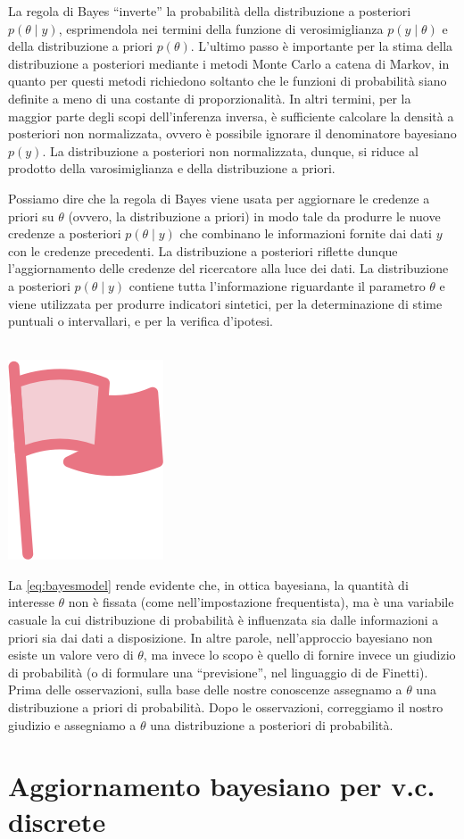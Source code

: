 \documentclass[
  10pt,
  italian,
  a4paper,
  extrafontsizes,onecolumn,openright
  ]{memoir}
\newenvironment{mdframedwithfootImportant}
{   
    \savenotes
    \begin{mdframed}[%
    topline=true, bottomline=true, linecolor=oiR, linewidth=0.5pt,
    rightline=false, leftline=false,
    backgroundcolor=oiLGray]
    \renewcommand{\thempfootnote}{\arabic{footnote}}
    }
{
    \end{mdframed}
    \spewnotes
}
\newenvironment{important}{
    \let\oldtextbf\textbf
    \renewcommand{\textbf}[1]{{\textcolor{oiR}{\oldtextbf{##1}}}}
\vspace{4mm}
\begin{mdframedwithfootImportant}
\begin{minipage}[t]{0.10\textwidth}
{$\:$ \\ \setkeys{Gin}{width=2.5em,keepaspectratio}\includegraphics{images/_icons/important.png}}
\end{minipage}
\hfill
\begin{minipage}[t]{0.90\textwidth}
\vspace{-2mm}
\setlength{\parskip}{1em}
}{\end{minipage}
\end{mdframedwithfootImportant}
\vspace{4mm}
}
\begin{document}
La regola di Bayes ``inverte'' la probabilità della distribuzione a posteriori \(p(\theta \mid y)\), esprimendola nei termini della funzione di verosimiglianza \(p(y \mid \theta)\) e della distribuzione a priori \(p(\theta)\). L'ultimo passo è importante per la stima della distribuzione a posteriori mediante i metodi Monte Carlo a catena di Markov, in quanto per questi metodi richiedono soltanto che le funzioni di probabilità siano definite a meno di una costante di proporzionalità. In altri termini, per la maggior parte degli scopi dell'inferenza inversa, è sufficiente calcolare la densità a posteriori non normalizzata, ovvero è possibile ignorare il denominatore bayesiano \(p(y)\). La distribuzione a posteriori non normalizzata, dunque, si riduce al prodotto della varosimiglianza e della distribuzione a priori.

Possiamo dire che la regola di Bayes viene usata per aggiornare le credenze a priori su \(\theta\) (ovvero, la distribuzione a priori) in modo tale da produrre le nuove credenze a posteriori \(p(\theta \mid y)\) che combinano le informazioni fornite dai dati \(y\) con le credenze precedenti. La distribuzione a posteriori riflette dunque l'aggiornamento delle credenze del ricercatore alla luce dei dati. La distribuzione a posteriori \(p(\theta \mid y)\) contiene tutta l'informazione riguardante il parametro \(\theta\) e viene utilizzata per produrre indicatori sintetici, per la determinazione di stime puntuali o intervallari, e per la verifica d'ipotesi.

\begin{important}
La \eqref{eq:bayesmodel} rende evidente che, in ottica bayesiana, la quantità di interesse \(\theta\) non è fissata (come nell'impostazione frequentista), ma è una variabile casuale la cui distribuzione di probabilità è influenzata sia dalle informazioni a priori sia dai dati a disposizione. In altre parole, nell'approccio bayesiano non esiste un valore vero di \(\theta\), ma invece lo scopo è quello di fornire invece un giudizio di probabilità (o di formulare una ``previsione'', nel linguaggio di de Finetti). Prima delle osservazioni, sulla base delle nostre conoscenze assegnamo a \(\theta\) una distribuzione a priori di probabilità. Dopo le osservazioni, correggiamo il nostro giudizio e assegniamo a \(\theta\) una distribuzione a posteriori di probabilità.

\end{important}

\hypertarget{aggiornamento-bayesiano-per-v.c.-discrete}{%
\section{Aggiornamento bayesiano per v.c. discrete}\label{aggiornamento-bayesiano-per-v.c.-discrete}}
\end{document}
